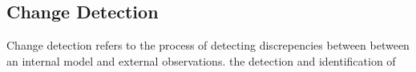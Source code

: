 \subsection{Change Detection}

Change detection refers to the process of detecting discrepencies between between an internal model and external observations.  the detection and identification of 